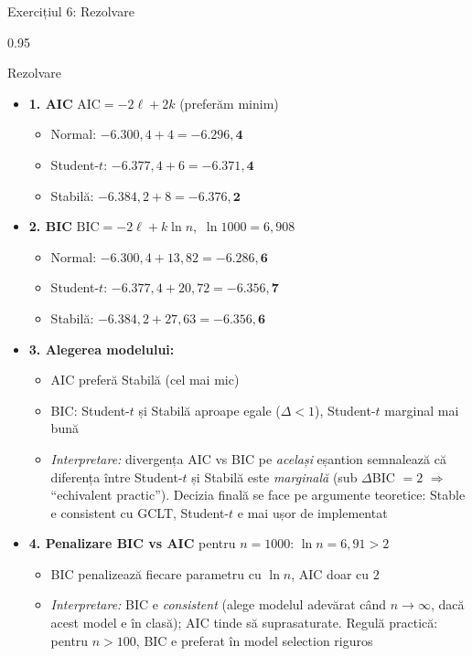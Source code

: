\documentclass[9pt, aspectratio=169, t]{beamer}
\begin{document}
\begin{frame}[shrink=25]{Exercițiul 6: Rezolvare}
\begin{cminipage}{0.95\textwidth}
\begin{exampleblock}{Rezolvare}
\small
\begin{itemize}\setlength{\itemsep}{0pt}
    \item \textbf{1. AIC} \quad $\text{AIC} = -2\ell + 2k$ \quad (preferăm minim)
    \begin{itemize}\setlength{\itemsep}{0pt}
        \item Normal: $-6.300{,}4 + 4 = \mathbf{-6.296{,}4}$
        \item Student-$t$: $-6.377{,}4 + 6 = \mathbf{-6.371{,}4}$
        \item Stabilă: $-6.384{,}2 + 8 = \mathbf{-6.376{,}2}$
    \end{itemize}
    \item \textbf{2. BIC} \quad $\text{BIC} = -2\ell + k\ln n$,\ $\ln 1000 = 6{,}908$
    \begin{itemize}\setlength{\itemsep}{0pt}
        \item Normal: $-6.300{,}4 + 13{,}82 = \mathbf{-6.286{,}6}$
        \item Student-$t$: $-6.377{,}4 + 20{,}72 = \mathbf{-6.356{,}7}$
        \item Stabilă: $-6.384{,}2 + 27{,}63 = \mathbf{-6.356{,}6}$
    \end{itemize}
    \item \textbf{3. Alegerea modelului:}
    \begin{itemize}\setlength{\itemsep}{0pt}
        \item AIC preferă Stabilă (cel mai mic)
        \item BIC: Student-$t$ și Stabilă aproape egale ($\Delta < 1$), Student-$t$ marginal mai bună
        \item \textit{Interpretare:} divergența AIC vs BIC pe \emph{același} eșantion semnalează că diferența între Student-$t$ și Stabilă este \emph{marginală} (sub $\Delta$BIC $= 2$ $\Rightarrow$ ``echivalent practic''). Decizia finală se face pe argumente teoretice: Stable e consistent cu GCLT, Student-$t$ e mai ușor de implementat
    \end{itemize}
    \item \textbf{4. Penalizare BIC vs AIC} \quad pentru $n = 1000$: $\ln n = 6{,}91 > 2$
    \begin{itemize}\setlength{\itemsep}{0pt}
        \item BIC penalizează fiecare parametru cu $\ln n$, AIC doar cu $2$
        \item \textit{Interpretare:} BIC e \emph{consistent} (alege modelul adevărat când $n \to \infty$, dacă acest model e în clasă); AIC tinde să suprasaturate. Regulă practică: pentru $n > 100$, BIC e preferat în model selection riguros
    \end{itemize}
\end{itemize}
\end{exampleblock}
\end{cminipage}
\end{frame}
\end{document}
